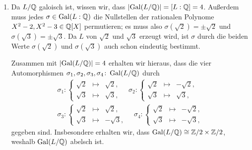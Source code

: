 \begin{solution}
\begin{enumerate}
    \item
      Da $L/\mathbb{Q}$ galoisch ist, wissen wir, dass $|{\operatorname{Gal}(L / \mathbb{Q})}| = [L : \mathbb{Q}] = 4$.
      Außerdem muss jedes $\sigma \in \operatorname{Gal}(L : \mathbb{Q})$ die Nullstellen der rationalen Polynome $X^2 - 2, X^2 - 3 \in \mathbb{Q}[X]$ permutieren;
      es muss also $\sigma(\sqrt{2}) = \pm \sqrt{2}$ und $\sigma(\sqrt{3}) = \pm \sqrt{3}$.
      Da $L$ von $\sqrt{2}$ und $\sqrt{3}$ erzeugt wird, ist $\sigma$ durch die beiden Werte $\sigma(\sqrt{2})$ und $\sigma(\sqrt{3})$ auch schon eindeutig bestimmt.
      
      Zusammen mit $|{\operatorname{Gal}(L / \mathbb{Q})}| = 4$ erhalten wir hieraus, dass die vier Automorphismen $\sigma_1, \sigma_2, \sigma_3, \sigma_4 \colon \operatorname{Gal}(L / \mathbb{Q})$ durch
      \begin{gather*}
        \sigma_1 \colon
        \left\{
          \begin{array}{ccr}
            \sqrt{2} & \mapsto  & \sqrt{2}, \\
            \sqrt{3} & \mapsto  & \sqrt{3},
          \end{array}
        \right.
        \quad
        \sigma_2 \colon
        \left\{
          \begin{array}{ccr}
            \sqrt{2} & \mapsto  & -\sqrt{2},  \\
            \sqrt{3} & \mapsto  &  \sqrt{3},
          \end{array}
        \right.
        \\
        \sigma_3 \colon
        \left\{
          \begin{array}{ccr}
            \sqrt{2} & \mapsto  &  \sqrt{2},  \\
            \sqrt{3} & \mapsto  & -\sqrt{3},
          \end{array}
        \right.
        \quad
        \sigma_4 \colon
        \left\{
          \begin{array}{ccr}
            \sqrt{2} & \mapsto  & -\sqrt{2},  \\
            \sqrt{3} & \mapsto  & -\sqrt{3},
          \end{array}
        \right.
      \end{gather*}
      gegeben sind.
      Insbesondere erhalten wir, dass $\operatorname{Gal}(L / \mathbb{Q}) \cong \mathbb{Z}/2 \times \mathbb{Z}/2$,
      weshalb $\operatorname{Gal}(L / \mathbb{Q})$ abelsch ist.
  \end{enumerate}
\end{solution}



